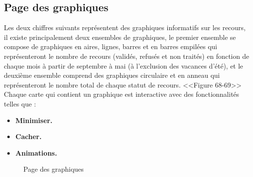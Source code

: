 \documentclass[12pt]{report}
\begin{document}
\subsection{Page des graphiques}

Les deux chiffres suivants représentent des graphiques informatifs sur les recours, il existe principalement deux ensembles de graphiques, le premier ensemble se compose de graphiques en aires, lignes, barres et en barres empilées qui représenteront le nombre de recours (validés, refusés et non traités) en fonction de chaque mois à partir de septembre à mai (à l'exclusion des vacances d'été), et le deuxième ensemble comprend des graphiques circulaire et en anneau qui représenteront le nombre total de chaque statut de recours. <<Figure 68-69>>
\\
Chaque carte qui contient un graphique est interactive avec des fonctionnalités telles que :
\begin{itemize}
  \item \textbf{Minimiser.}
  \item \textbf{Cacher.}
  \item \textbf{Animations.}
\end{itemize}

\newpage

\begin{figure}[H]
\centering
\caption{Page des graphiques}
\end{figure}
\end{document}
